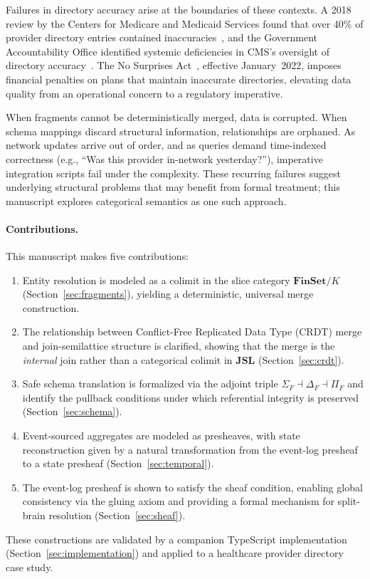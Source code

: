 \documentclass[11pt,a4paper]{article}
\begin{document}
Failures in directory accuracy arise at the boundaries of these
contexts. A 2018 review by the Centers for Medicare and Medicaid
Services found that over 40\% of provider directory entries contained
inaccuracies~\citep{cms2018}, and the Government Accountability Office
identified systemic deficiencies in CMS's oversight of directory
accuracy~\citep{gao2018}. The No Surprises Act~\citep{nosurprisesact2022},
effective January~2022, imposes financial penalties on plans that
maintain inaccurate directories, elevating data quality from an
operational concern to a regulatory imperative.

When fragments cannot be deterministically merged, data is corrupted.
When schema mappings discard structural information, relationships are
orphaned. As network updates arrive out of order, and as queries demand
time-indexed correctness (e.g., ``Was this provider in-network
yesterday?''), imperative integration scripts fail under the
complexity. These recurring failures suggest underlying structural
problems that may benefit from formal treatment; this manuscript
explores categorical semantics as one such approach.

\paragraph{Contributions.}
This manuscript makes five contributions:
\begin{enumerate}[label=(\roman*)]
  \item Entity resolution is modeled as a colimit in the slice category
    $\mathbf{FinSet}/K$ (Section~\ref{sec:fragments}), yielding a
    deterministic, universal merge construction.
  \item The relationship between Conflict-Free Replicated Data Type (CRDT) merge and
    join-semilattice structure is clarified, showing that the merge is the
    \emph{internal} join rather than a categorical colimit in
    $\mathbf{JSL}$ (Section~\ref{sec:crdt}).
  \item Safe schema translation is formalized via the adjoint triple
    $\Sigma_F \dashv \Delta_F \dashv \Pi_F$ and identify the pullback
    conditions under which referential integrity is
    preserved (Section~\ref{sec:schema}).
  \item Event-sourced aggregates are modeled as presheaves, with state
    reconstruction given by a natural transformation from the event-log
    presheaf to a state presheaf (Section~\ref{sec:temporal}).
  \item The event-log presheaf is shown to satisfy the sheaf condition,
    enabling global consistency via the gluing axiom and providing a
    formal mechanism for split-brain resolution
    (Section~\ref{sec:sheaf}).
\end{enumerate}
These constructions are validated by a companion TypeScript
implementation (Section~\ref{sec:implementation}) and applied to a
healthcare provider directory case study.
\end{document}
